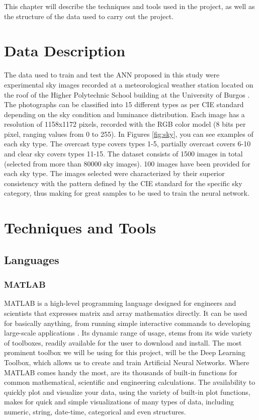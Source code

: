 
This chapter will describe the techniques and tools used in the project, as well as the structure of the data used to carry out the project.

\section{Data Description}
The data used to train and test the ANN proposed in this study were experimental sky images recorded at a meteorological weather station located on the roof of the Higher Polytechnic School building at the University of Burgos \cite{skyClassANN-Granados-Lopéz}. The photographs can be classified into 15 different types as per CIE standard \cite{García-Ruiz} depending on the sky condition and luminance distribution. Each image has a resolution of 1158x1172 pixels, recorded with the RGB color model (8 bits per pixel, ranging values from 0 to 255). In Figures \ref{fig:sky}, you can see examples of each sky type. The overcast type covers types 1-5, partially overcast covers 6-10 and clear sky covers types 11-15. The dataset consists of 1500 images in total (selected from more than 80000 sky images). 100 images have been provided for each sky type. The images selected were characterized by their superior consistency with the pattern defined by the CIE standard for the specific sky category, thus making for great samples to be used to train the neural network.

\section{Techniques and Tools}

\subsection{Languages}
\subsubsection{MATLAB}
MATLAB is a high-level programming language designed for engineers and scientists that expresses matrix and array mathematics directly. It can be used for basically anything, from running simple interactive commands to developing large-scale applications \cite{mathworks:matlab}. Its dynamic range of usage, stems from its wide variety of toolboxes, readily available for the user to download and install. The most prominent toolbox we will be using for this project, will be the Deep Learning Toolbox, which allows us to create and train Artificial Neural Networks. Where MATLAB comes handy the most, are its thousands of built-in functions for common mathematical, scientific and engineering calculations. The availability to quickly plot and visualize your data, using the variety of built-in plot functions, makes for quick and simple visualizations of many types of data, including numeric, string, date-time, categorical and even structures.

